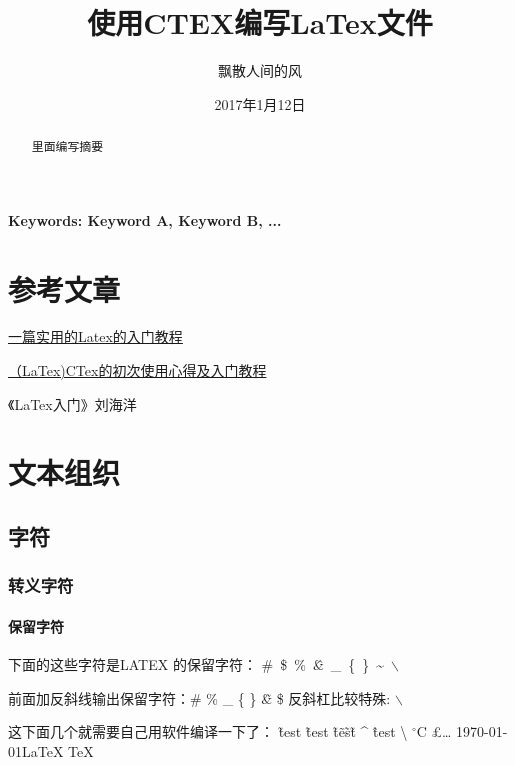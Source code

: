 \documentclass[a4paper,10 pt, conference]{article}     %
\begin{document}
    \author{飘散人间的风}     %
    \date{2017年1月12日}      %
    \title{使用CTEX编写LaTex文件}     %
    \maketitle %

    \begin{abstract}
         里面编写摘要
    \end{abstract}

    \textbf{\large Keywords: Keyword A, Keyword B, ...}


    \tableofcontents{}   %



\section{参考文章}
    \href{http://blog.csdn.net/u014803202/article/details/50410748}{一篇实用的Latex的入门教程}

    \href{http://m.blog.csdn.net/article/details?id=50110329}{（LaTex)CTex的初次使用心得及入门教程}

    《LaTex入门》刘海洋


\section{文本组织}
    \subsection{字符}
    \subsubsection{转义字符}
    \paragraph{保留字符}

    下面的这些字符是LATEX 的保留字符： \mbox{\# \$ \% \^ \& \_ \{ \} \~ $\backslash$}

    前面加反斜线输出保留字符：\#  \%  \_  \{ \}  \~   \&  \$ 反斜杠比较特殊: $\backslash$

    这下面几个就需要自己用软件编译一下了：
\~{test}   \~{t}{e}{s}{t}
\~{t}\~{e}\~{s}\~{t} \^{}
\^{test}  \textbackslash
\textcopyright \textregistered $^\circ$C
\pounds \dots
\today  \LaTeX{}
\TeX{} \LaTeXe{}
\end{document}
